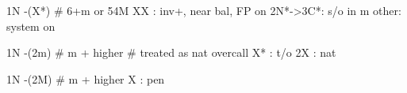 1N -(X*) # 6+m or 54M
XX : inv+, near bal, FP on
2N*->3C*: s/o in m
other: system on

1N -(2m) # m + higher
# treated as nat overcall
X* : t/o
2X : nat

1N -(2M) # m + higher
X  : pen